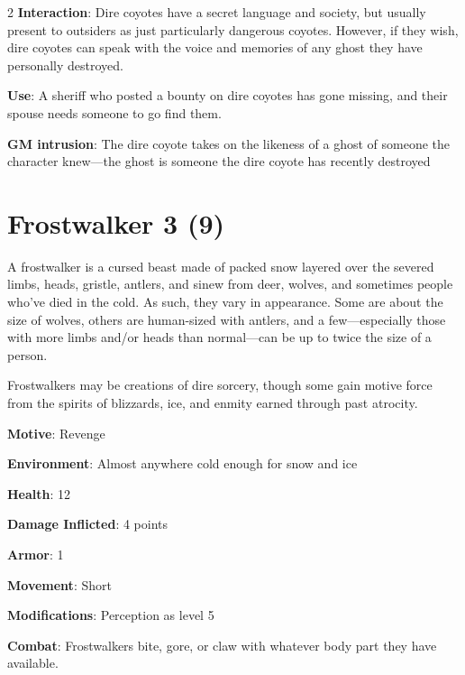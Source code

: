 \begin{multicols}{2}
\textbf{Interaction}: Dire coyotes have a secret language and society, but usually present to outsiders as just particularly dangerous coyotes. However, if they wish, dire coyotes can speak with the voice and memories of any ghost they have personally destroyed. 

\textbf{Use}: A sheriff who posted a bounty on dire coyotes has gone missing, and their spouse needs someone to go find them.

\textbf{GM intrusion}: The dire coyote takes on the likeness of a ghost of someone the character knew—the ghost is someone the dire coyote has recently destroyed

\section{Frostwalker 3 (9)}

A frostwalker is a cursed beast made of packed snow layered over the severed limbs, heads, gristle, antlers, and sinew from deer, wolves, and sometimes people who’ve died in the cold. As such, they vary in appearance. Some are about the size of wolves, others are human-sized with antlers, and a few—especially those with more limbs and/or heads than normal—can be up to twice the size of a person. 

Frostwalkers may be creations of dire sorcery, though some gain motive force from the spirits of blizzards, ice, and enmity earned through past atrocity.

\textbf{Motive}: Revenge 

\textbf{Environment}: Almost anywhere cold enough for snow and ice 

\textbf{Health}: 12 

\textbf{Damage Inflicted}: 4 points 

\textbf{Armor}: 1 

\textbf{Movement}: Short 

\textbf{Modifications}: Perception as level 5 

\textbf{Combat}: Frostwalkers bite, gore, or claw with whatever body part they have available. 


\end{multicols}

